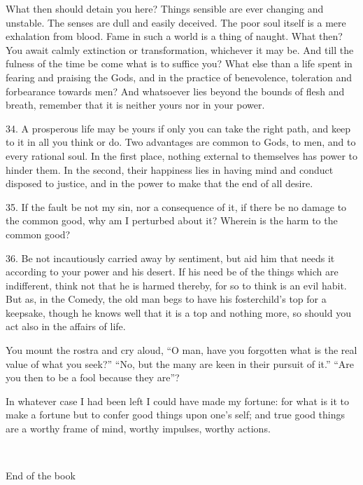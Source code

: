 \documentclass{book}
\newcommand\terminus[1]{\vspace{2em}\emph{#1} \\[2em] \begin{center}End of the \ordinalstring{chapter} book\end{center}}
\begin{document}
What then should detain you here? Things sensible are ever changing
and unstable. The senses are dull and easily deceived. The poor soul
itself is a mere exhalation from blood. Fame in such a world is a
thing of naught. What then? You await calmly extinction or
transformation, whichever it may be. And till the fulness of the time
be come what is to suffice you? What else than a life spent in fearing
and praising the Gods, and in the practice of benevolence, toleration
and forbearance towards men? And whatsoever lies beyond the bounds of
flesh and breath, remember that it is neither yours nor in your power.

34. A prosperous life may be yours if only you can take the right
path, and keep to it in all you think or do. Two advantages are common
to Gods, to men, and to every rational soul. In the first place,
nothing external to themselves has power to hinder them. In the
second, their happiness lies in having mind and conduct disposed to
justice, and in the power to make that the end of all desire.

35. If the fault be not my sin, nor a consequence of it, if there be
no damage to the common good, why am I perturbed about it? Wherein is
the harm to the common good?

36. Be not incautiously carried away by sentiment, but aid him that
needs it according to your power and his desert. If his need be of the
things which are indifferent, think not that he is harmed thereby, for
so to think is an evil habit. But as, in the Comedy, the old man begs
to have his fosterchild's top for a keepsake, though he knows well
that it is a top and nothing more, so should you act also in the
affairs of life.

You mount the rostra and cry aloud, ``O man, have you forgotten what is
the real value of what you seek?'' ``No, but the many are keen in their
pursuit of it.'' ``Are you then to be a fool because they are''?

\newpage

In whatever case I had been left I could have made my fortune: for
what is it to make a fortune but to confer good things upon one's
self; and true good things are a worthy frame of mind, worthy
impulses, worthy actions.

\terminus{}

\chapter[The substance of the Universe...]{}
\end{document}
